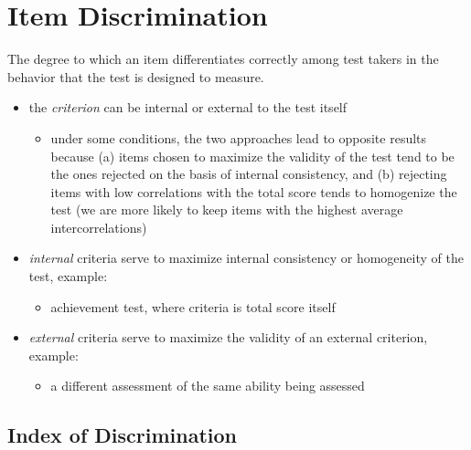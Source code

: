 \documentclass[
  english,
]{book}
\providecommand{\tightlist}{%
  \setlength{\itemsep}{0pt}\setlength{\parskip}{0pt}}
\begin{document}
\hypertarget{item-discrimination}{%
\section{Item Discrimination}\label{item-discrimination}}

The degree to which an item differentiates correctly among test takers in the behavior that the test is designed to measure.

\begin{itemize}
\tightlist
\item
  the \emph{criterion} can be internal or external to the test itself

  \begin{itemize}
  \tightlist
  \item
    under some conditions, the two approaches lead to opposite results because (a) items chosen to maximize the validity of the test tend to be the ones rejected on the basis of internal consistency, and (b) rejecting items with low correlations with the total score tends to homogenize the test (we are more likely to keep items with the highest average intercorrelations)
  \end{itemize}
\item
  \emph{internal} criteria serve to maximize internal consistency or homogeneity of the test, example:

  \begin{itemize}
  \tightlist
  \item
    achievement test, where criteria is total score itself
  \end{itemize}
\item
  \emph{external} criteria serve to maximize the validity of an external criterion, example:

  \begin{itemize}
  \tightlist
  \item
    a different assessment of the same ability being assessed
  \end{itemize}
\end{itemize}

\hypertarget{index-of-discrimination}{%
\subsection{Index of Discrimination}\label{index-of-discrimination}}
\end{document}
